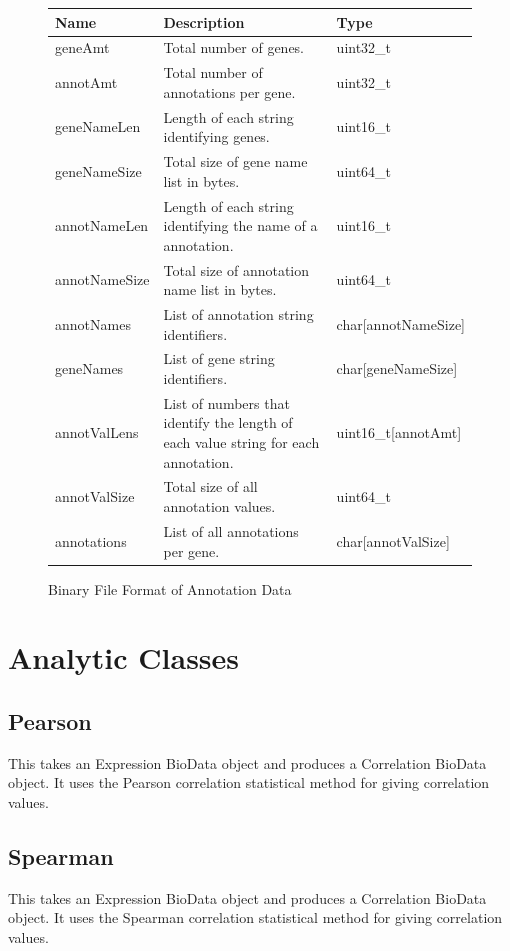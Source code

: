 \documentclass[10pt]{article}
\begin{document}
\begin{appendices}
\begin{figure}[H]
\begin{mdframed}[style=btable]
\begin{tabularx}{\textwidth}{|l|X|l|}
\hline
\textbf{Name} & \textbf{Description} & \textbf{Type} \\
\hline
geneAmt & Total number of genes. & uint32\_t \\
\hline
annotAmt & Total number of annotations per gene. & uint32\_t \\
\hline
geneNameLen & Length of each string identifying genes. & uint16\_t \\
\hline
geneNameSize & Total size of gene name list in bytes. & uint64\_t \\
\hline
annotNameLen & Length of each string identifying the name of a annotation. & 
uint16\_t \\
\hline
annotNameSize & Total size of annotation name list in bytes. & uint64\_t \\
\hline
annotNames & List of annotation string identifiers. & char[annotNameSize] \\
\hline
geneNames & List of gene string identifiers. & char[geneNameSize] \\
\hline
annotValLens & List of numbers that identify the length of each value string 
for each annotation. & uint16\_t[annotAmt] \\
\hline
annotValSize & Total size of all annotation values. & uint64\_t \\
\hline
annotations & List of all annotations per gene. & char[annotValSize] \\
\hline
\end{tabularx}
\end{mdframed}
\caption{Binary File Format of Annotation Data}
\label{fig:annotation}
\end{figure}

\newpage
\section{Analytic Classes}

\subsection{Pearson}

This takes an Expression BioData object and produces a Correlation BioData 
object. It uses the Pearson correlation statistical method for giving 
correlation values.

\subsection{Spearman}

This takes an Expression BioData object and produces a Correlation BioData 
object. It uses the Spearman correlation statistical method for giving 
correlation values.

\end{appendices}
\end{document}
